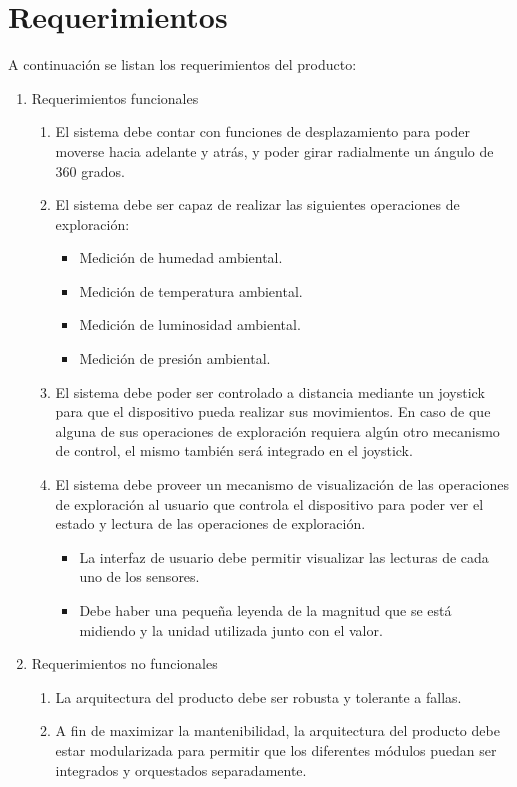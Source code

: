 \section{Requerimientos}
A continuación se listan los requerimientos del producto:
\begin{enumerate}	
	
	\item Requerimientos funcionales		
	\begin{enumerate}			
		\item El sistema debe contar con funciones de desplazamiento para poder moverse hacia adelante y atrás, y poder girar radialmente un ángulo de 360 grados.			
		\item El sistema debe ser capaz de realizar las siguientes operaciones de exploración:			
			\begin{itemize}
				\item Medición de humedad ambiental.				
				\item Medición de temperatura ambiental.				
				\item Medición de luminosidad ambiental.				
				\item Medición de presión ambiental.			
			\end{itemize}			
		\item El sistema debe poder ser controlado a distancia mediante un joystick para que el dispositivo pueda realizar sus movimientos. En caso de que alguna de sus operaciones de exploración requiera algún otro mecanismo de control, el mismo también será integrado en el joystick.		
		\item El sistema debe proveer un mecanismo de visualización de las operaciones de exploración al usuario que controla el dispositivo para poder ver el estado y lectura de las operaciones de exploración.		
		\begin{itemize}	
			\item La interfaz de usuario debe permitir visualizar las lecturas de cada uno de los sensores.
			\item Debe haber una pequeña leyenda de la magnitud que se está midiendo y la unidad utilizada junto con el valor.
		\end{itemize}		
		
	\end{enumerate}	
	
	\item Requerimientos no funcionales		
		\begin{enumerate}			
			\item La arquitectura del producto debe ser robusta y tolerante a fallas.
			\item A fin de maximizar la mantenibilidad, la arquitectura del producto debe estar modularizada para permitir que los diferentes módulos puedan ser integrados y orquestados separadamente.
			
		\end{enumerate}	
	
\end{enumerate}
